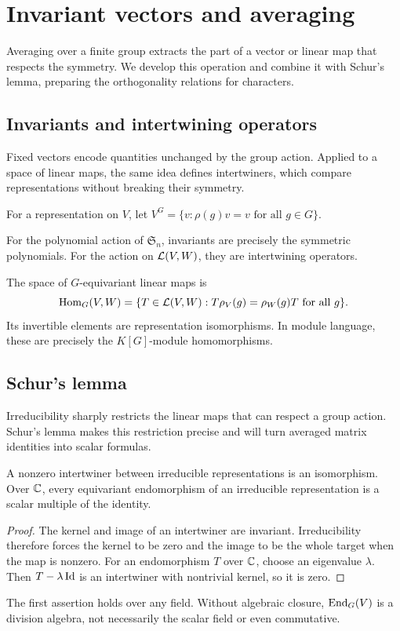 \section{Invariant vectors and averaging}

Averaging over a finite group extracts the part of a vector or linear map
that respects the symmetry. We develop this operation and combine it with
Schur's lemma, preparing the orthogonality relations for characters.

\subsection{Invariants and intertwining operators}
\label{sect2-invariance-representation}

Fixed vectors encode quantities unchanged by the group action. Applied to a
space of linear maps, the same idea defines intertwiners, which compare
representations without breaking their symmetry.

\begin{defn}
\label{defn-sub-invariant}\label{notation-80}
For a representation on $V$, let
$V^G=\{v:\rho(g)v=v\text{ for all }g\in G\}$.
\end{defn}
For the polynomial action of $\mathfrak S_n$, invariants are precisely
the symmetric polynomials. For the action on $\mathcal{L}(V,W)$, they are
intertwining operators.
\begin{defn}
\label{defn-interlacing-operators}\label{notation-81}
The space of $G$-equivariant linear maps is
\[
 \operatorname{Hom}_G(V,W)=\{T\in\mathcal{L}(V,W):T\rho_V(g)=\rho_W(g)T\text{ for all }g\}.
\]
Its invertible elements are representation isomorphisms. In module language,
these are precisely the $K[G]$-module homomorphisms.
\end{defn}

\subsection{Schur's lemma}

Irreducibility sharply restricts the linear maps that can respect a group
action. Schur's lemma makes this restriction precise and will turn averaged
matrix identities into scalar formulas.

\begin{lem}
\label{lemma-schur}\label{notation-82}\label{notation-83}
A nonzero intertwiner between irreducible representations is an isomorphism.
Over $\mathbb{C}$, every equivariant endomorphism of an irreducible representation
is a scalar multiple of the identity.
\end{lem}
\begin{proof}
The kernel and image of an intertwiner are invariant. Irreducibility
therefore forces the kernel to be zero and the image to be the whole
target when the map is nonzero. For an endomorphism $T$ over $\mathbb{C}$,
choose an eigenvalue $\lambda$. Then $T-\lambda\operatorname{Id}$ is an intertwiner
with nontrivial kernel, so it is zero.
\end{proof}
The first assertion holds over any field. Without algebraic closure,
$\operatorname{End}_G(V)$ is a division algebra, not necessarily the scalar field
or even commutative.

